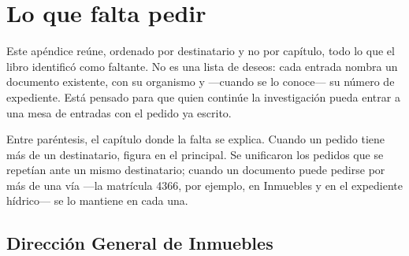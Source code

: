 \chapter{Lo que falta pedir}

\label{cap:pedidos}
Este apéndice reúne, ordenado por destinatario y no por capítulo, todo lo que el libro
identificó como faltante. No es una lista de deseos: cada entrada nombra un documento
existente, con su organismo y —cuando se lo conoce— su número de expediente. Está pensado
para que quien continúe la investigación pueda entrar a una mesa de entradas con el pedido
ya escrito.

Entre paréntesis, el capítulo donde la falta se explica. Cuando un pedido tiene más de un destinatario, figura en el principal. Se unificaron los pedidos que se repetían ante un mismo destinatario; cuando un documento puede pedirse por más de una vía ---la matrícula 4366, por ejemplo, en Inmuebles y en el expediente hídrico--- se lo mantiene en cada una.

\section{Dirección General de Inmuebles}

